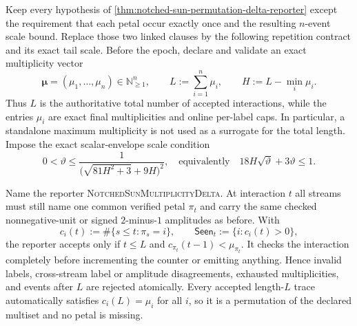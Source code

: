 \begin{theorem}
\label{thm:notched-sun-multiplicity-delta-reporter}
Keep every hypothesis of
\cref{thm:notched-sun-permutation-delta-reporter} except the requirement that
each petal occur exactly once and the resulting $n$-event scale bound.  Replace
those two linked clauses by the following repetition contract and its exact
tail scale.  Before the epoch, declare and validate an exact multiplicity
vector
\begin{equation}
 \boldsymbol\mu=(\mu_1,\ldots,\mu_n)\in\mathbb N_{\geq1}^{n},
 \qquad
 L:=\sum_{i=1}^{n}\mu_i,
 \qquad
 H:=L-\min_i\mu_i.
 \label{eq:notched-sun-multiplicity-contract}
\end{equation}
Thus $L$ is the authoritative total number of accepted interactions, while
the entries $\mu_i$ are exact final multiplicities and online per-label caps.
In particular, a standalone maximum multiplicity is not used as a surrogate
for the total length.  Impose the exact scalar-envelope scale condition
\begin{equation}
 0<\vartheta
 \leq
 \frac{1}{\bigl(\sqrt{81H^2+3}+9H\bigr)^2},
 \quad\text{equivalently}\quad
 18H\sqrt\vartheta+3\vartheta\leq1.
 \label{eq:notched-sun-multiplicity-scale}
\end{equation}

Name the reporter \textsc{NotchedSunMultiplicityDelta}.  At interaction $t$
all streams must still name one common verified petal $\pi_t$ and carry the
same checked nonnegative-unit or signed $2$-minus-$1$ amplitudes as before.
With
\begin{equation}
 c_i(t):=\#\{s\leq t:\pi_s=i\},
 \qquad
 \mathsf{Seen}_t:=\{i:c_i(t)>0\},
 \label{eq:notched-sun-multiplicity-prefix}
\end{equation}
the reporter accepts only if $t\leq L$ and
$c_{\pi_t}(t-1)<\mu_{\pi_t}$.  It checks the interaction completely before
incrementing the counter or emitting anything.  Hence invalid labels,
cross-stream label or amplitude disagreements, exhausted multiplicities, and
events after $L$ are rejected atomically.  Every accepted length-$L$ trace
automatically satisfies $c_i(L)=\mu_i$ for all $i$, so it is a permutation of
the declared multiset and no petal is missing.


\end{theorem}
